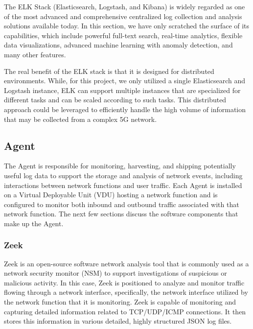 \documentclass[final,1p,times,authoryear]{elsarticle}
\begin{document}
\vspace{1em}

The ELK Stack (Elasticsearch, Logstash, and Kibana) is widely regarded as one of the most advanced and comprehensive centralized log collection and analysis solutions available today. In this section, we have only scratched the surface of its capabilities, which include powerful full-text search, real-time analytics, flexible data visualizations, advanced machine learning with anomaly detection, and many other features.

\vspace{1em}

The real benefit of the ELK stack is that it is designed for distributed environments. While, for this project, we only utilized a single Elasticsearch and Logstash instance, ELK can support multiple instances that are specialized for different tasks and can be scaled according to such tasks. This distributed approach could be leveraged to efficiently handle the high volume of information that may be collected from a complex 5G network.

\subsection{Agent}
\label{sub3sub3}
The Agent is responsible for monitoring, harvesting, and shipping potentially useful log data to support the storage and analysis of network events, including interactions between network functions and user traffic. Each Agent is installed on a Virtual Deployable Unit (VDU) hosting a network function and is configured to monitor both inbound and outbound traffic associated with that network function. The next few sections discuss the software components that make up the Agent.

\subsubsection{Zeek}
\label{sub3sub3sec1}
Zeek is an open-source software network analysis tool that is commonly used as a network security monitor (NSM) to support investigations of suspicious or malicious activity. In this case, Zeek is positioned to analyze and monitor traffic flowing through a network interface, specifically, the network interface utilized by the network function that it is monitoring. Zeek is capable of monitoring and capturing detailed information related to TCP/UDP/ICMP connections. It then stores this information in various detailed, highly structured JSON log files.
\end{document}
